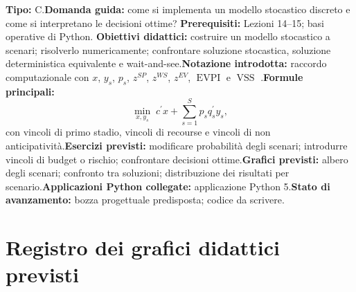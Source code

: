 \documentclass[12pt,a4paper]{article}%
\begin{document}
\textbf{Tipo:} C.\newline\textbf{Domanda guida:} come si implementa un modello
stocastico discreto e come si interpretano le decisioni ottime?\newline%
\textbf{Prerequisiti:} Lezioni 14--15; basi operative di Python.\newline%
\textbf{Obiettivi didattici:} costruire un modello stocastico a scenari;
risolverlo numericamente; confrontare soluzione stocastica, soluzione
deterministica equivalente e wait-and-see.\newline\textbf{Notazione
introdotta:} raccordo computazionale con $x$, $y_{s}$, $p_{s}$, $z^{SP}$,
$z^{WS}$, $z^{EV}$, $\operatorname{EVPI}$ e $\operatorname{VSS}$%
.\newline\textbf{Formule principali:}
\[
\min_{x,y_{s}} \; c^{\prime}x+\sum_{s=1}^{S}p_{s} q_{s}^{\prime}y_{s},
\]
con vincoli di primo stadio, vincoli di recourse e vincoli di non
anticipativit\`{a}.\newline\textbf{Esercizi previsti:} modificare
probabilit\`{a} degli scenari; introdurre vincoli di budget o rischio;
confrontare decisioni ottime.\newline\textbf{Grafici previsti:} albero degli
scenari; confronto tra soluzioni; distribuzione dei risultati per
scenario.\newline\textbf{Applicazioni Python collegate:} applicazione Python
5.\newline\textbf{Stato di avanzamento:} bozza progettuale predisposta; codice
da scrivere.

\section{Registro dei grafici didattici previsti}
\end{document}
